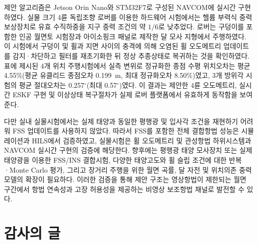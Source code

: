 \documentclass[]{IAC_style}
\begin{document}
제안 알고리즘은 Jetson Orin Nano와 STM32F7로 구성된 NAVCOM에 실시간 구현하였다. 실물 크기 4륜 독립조향 로버를 이용한 하드웨어 시험에서는 헬륨 부력식 중력보상장치로 유효 수직하중을 지구 중력 조건의 약 $1/6$로 낮추었다. 로버는 구덩이를 포함한 인공 월면토 시험장과 아이소핑크 패널로 제작한 달 모사 지형에서 주행하였다. 이 시험에서 구덩이 및 휠과 지면 사이의 충격에 의해 오염된 휠 오도메트리 업데이트를 감지·차단하고 필터를 재초기화한 뒤 정상 추종상태로 복귀하는 것을 확인하였다. 표에 제시된 4개 위치 주행시험에서 실측 변위로 정규화한 종점 수평 위치오차는 평균 4.55\%(평균 유클리드 종점오차 0.199~m, 최대 정규화오차 8.50\%)였고, 3개 방위각 시험의 평균 절대오차는 0.257$^\circ$(최대 0.57$^\circ$)였다. 이 결과는 제안한 4륜 오도메트리, 실시간 ESKF 구현 및 이상상태 복구절차가 실제 로버 플랫폼에서 유효하게 동작함을 보여준다.

다만 실내 실물시험에서는 실제 태양과 동일한 평행광 및 입사각 조건을 재현하기 어려워 FSS 업데이트를 사용하지 않았다. 따라서 FSS를 포함한 전체 결합항법 성능은 시뮬레이션과 HILS에서 검증하였고, 실물시험은 휠 오도메트리 및 관성항법 하위시스템과 NAVCOM 실시간 구현의 검증에 해당한다. 향후에는 평행광 태양 모사장치 또는 실제 태양광을 이용한 FSS/INS 결합시험, 다양한 태양고도와 휠 슬립 조건에 대한 반복·Monte Carlo 평가, 그리고 장거리 주행을 위한 월면 곡률, 달 자전 및 위치의존 중력모델의 확장이 필요하다. 이러한 검증을 통해 제안 구조는 영상항법이 제한되는 월면 구간에서 항법 연속성과 고장 허용성을 제공하는 비영상 보조항법 채널로 발전할 수 있다.

\section*{감사의 글}


\end{document}
